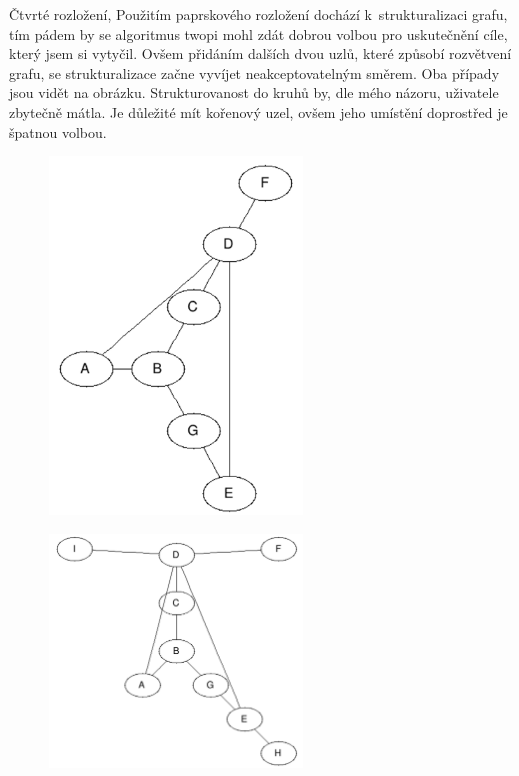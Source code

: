 \documentclass[color,table,oneside,nolot,nolof]{fithesis}
\begin{document}
	Čtvrté rozložení, \cite{graphviz_layout}
	Použitím paprskového rozložení dochází k~strukturalizaci grafu, tím pádem by se algoritmus twopi mohl zdát 
	dobrou volbou pro uskutečnění cíle, který jsem si vytyčil. Ovšem přidáním dalších dvou uzlů, které způsobí rozvětvení grafu, se strukturalizace začne vyvíjet neakceptovatelným směrem.
	Oba případy jsou vidět na obrázku. Strukturovanost do kruhů by, dle mého názoru, uživatele zbytečně mátla. Je důležité mít kořenový uzel, ovšem jeho umístění doprostřed je špatnou
	volbou.
\begin{figure}
	\centering
	\includegraphics[width=0.6\textwidth]{pictures/twopi_example.png} 
\end{figure}
\begin{figure}
	\centering
	\includegraphics[width=0.6\textwidth]{pictures/twopi_example_2.png} 
\end{figure}
\end{document}
